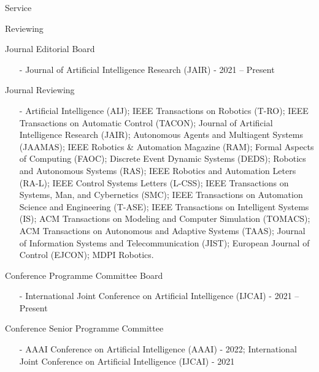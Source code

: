 \begin{rSection}{Service}
\begin{rSubsection}{Reviewing}{}{}{}
\item Journal Editorial Board
\begin{itemize}
\vspace*{-0.2cm}
\item[-] Journal of Artificial Intelligence Research (JAIR) - 2021 -- Present 
\end{itemize}

\item Journal Reviewing
\begin{itemize}
\vspace*{-0.2cm}
\item[-]  Artificial Intelligence (AIJ); IEEE Transactions on Robotics (T-RO); IEEE Transactions on Automatic Control (TACON); Journal of Artificial Intelligence Research (JAIR); Autonomous Agents and Multiagent Systems (JAAMAS); IEEE Robotics \& Automation Magazine (RAM); Formal Aspects of Computing (FAOC); Discrete Event Dynamic Systems (DEDS); Robotics and Autonomous Systems (RAS); IEEE Robotics and Automation Leters (RA-L); IEEE Control Systems Letters (L-CSS);  IEEE Transactions on Systems, Man, and Cybernetics (SMC);  IEEE Transactions on Automation Science and Engineering (T-ASE); IEEE Transactions on Intelligent Systems (IS); ACM Transactions on Modeling and Computer Simulation (TOMACS); ACM Transactions on Autonomous and Adaptive Systems (TAAS); Journal of Information Systems and Telecommunication (JIST); European Journal of Control  (EJCON); MDPI Robotics.
\end{itemize}

\item{Conference Programme Committee Board}
\begin{itemize}
\vspace*{-0.2cm}
\item[-]  International Joint Conference on Artificial Intelligence (IJCAI) - 2021 -- Present
\end{itemize}

\item{Conference Senior Programme Committee}
\begin{itemize}
\vspace*{-0.2cm}
\item[-]  AAAI Conference on Artificial Intelligence (AAAI) - 2022; International Joint Conference on Artificial Intelligence (IJCAI) - 2021
\end{itemize}


\end{rSubsection}
\end{rSection}
